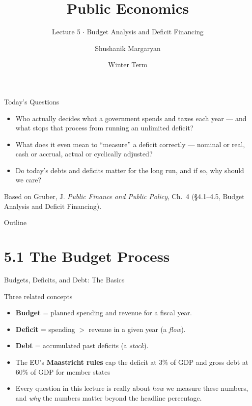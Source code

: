 \documentclass[11pt,aspectratio=169]{beamer}
\title{Public Economics}
\subtitle{Lecture 5 \(\cdot\) Budget Analysis and Deficit Financing}
\author{Shushanik Margaryan}
\institute{WU Vienna University of Economics and Business}
\date{Winter Term}
\begin{document}
\begin{frame}
  \titlepage
\end{frame}

\begin{frame}{Today's Questions}
  \begin{itemize}
    \item Who actually decides what a government spends and taxes each year --- and what stops that process from running an unlimited deficit?
    \item What does it even mean to ``measure'' a deficit correctly --- nominal or real, cash or accrual, actual or cyclically adjusted?
    \item Do today's debts and deficits matter for the long run, and if so, why should we care?
  \end{itemize}
  \vspace{1em}
  \begin{block}{Based on}
    Gruber, J. \emph{Public Finance and Public Policy}, Ch.\ 4 (\S4.1--4.5, Budget Analysis and Deficit Financing).
  \end{block}
\end{frame}

\begin{frame}{Outline}
  \tableofcontents
\end{frame}

\section{5.1 The Budget Process}

\begin{frame}{Budgets, Deficits, and Debt: The Basics}
  \begin{block}{Three related concepts}
    \end{block}
    \begin{itemize}
    \item    \textbf{Budget} = planned spending and revenue for a fiscal year.\\
    \item 	\textbf{Deficit} = spending $>$ revenue in a given year (a \emph{flow}).\\
    \item 	\textbf{Debt} = accumulated past deficits (a \emph{stock}).
\end{itemize}


  \vspace{0.3em}
  \begin{itemize}
    \item The EU's \textbf{Maastricht rules} cap the deficit at 3\% of GDP and gross debt at 60\% of GDP for member states  
    \item Every question in this lecture is really about \emph{how} we measure these numbers, and \emph{why} the numbers matter beyond the headline percentage.
  \end{itemize}
\end{frame}
\end{document}

